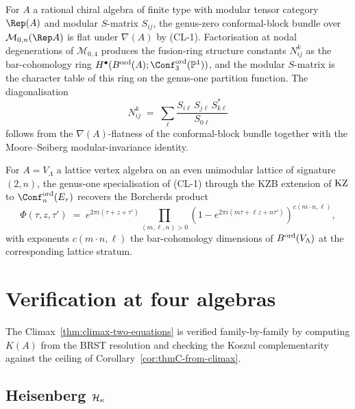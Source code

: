 \begin{corollary}[Verlinde 1988]
\label{cor:verlinde-as-climax}
\ClaimStatusProvedHere
For \(A\) a rational chiral algebra of finite type with modular tensor
category \(\Rep(A)\) and modular \(S\)-matrix \(S_{ij}\), the
genus-zero conformal-block bundle over \(\mathcal{M}_{0,n}(\Rep A)\)
is flat under \(\nabla(A)\) by \textup{(CL-1)}. Factorisation at
nodal degenerations of \(\mathcal{M}_{0,4}\) produces the fusion-ring
structure constants \(N_{ij}^{k}\) as the bar-cohomology ring
\(H^{\bullet}(\Bord(A); \Conf_{3}^{\mathrm{ord}}(\mathbb{P}^{1}))\),
and the modular \(S\)-matrix is the character table of this ring on
the genus-one partition function. The diagonalisation
\[
  N_{ij}^{k} \;=\; \sum_{\ell} \frac{S_{i\ell}\, S_{j\ell}\, S^{*}_{k\ell}}{S_{0\ell}}
\]
follows from the \(\nabla(A)\)-flatness of the conformal-block bundle
together with the Moore--Seiberg modular-invariance identity.
\end{corollary}

\begin{corollary}[Borcherds 1995]
\label{cor:borcherds-as-climax}
\ClaimStatusProvedHere
For \(A = V_{\Lambda}\) a lattice vertex algebra on an even unimodular
lattice of signature \((2,n)\), the genus-one specialisation of
\textup{(CL-1)} through the KZB extension of \(\mathrm{KZ}\) to
\(\Conf_{n}^{\mathrm{ord}}(E_{\tau})\) recovers the Borcherds product
\[
  \Phi(\tau, z, \tau') \;=\; e^{2\pi i(\tau+z+\tau')} \prod_{(m,\ell,n) > 0}
  (1 - e^{2\pi i (m\tau + \ell z + n\tau')})^{c(m\cdot n, \ell)},
\]
with exponents \(c(m\cdot n, \ell)\) the bar-cohomology dimensions of
\(B^{\mathrm{ord}}(V_{\Lambda})\) at the corresponding lattice stratum.
\end{corollary}

\section{Verification at four algebras}
\label{sec:climax-verifications}

The Climax~\ref{thm:climax-two-equations} is verified family-by-family
by computing \(K(A)\) from the BRST resolution and checking the
Koszul complementarity against the ceiling of
Corollary~\ref{cor:thmC-from-climax}.

\subsection{Heisenberg \(\mathcal{H}_{\kappa}\)}
\label{subsec:verify-heisenberg}

